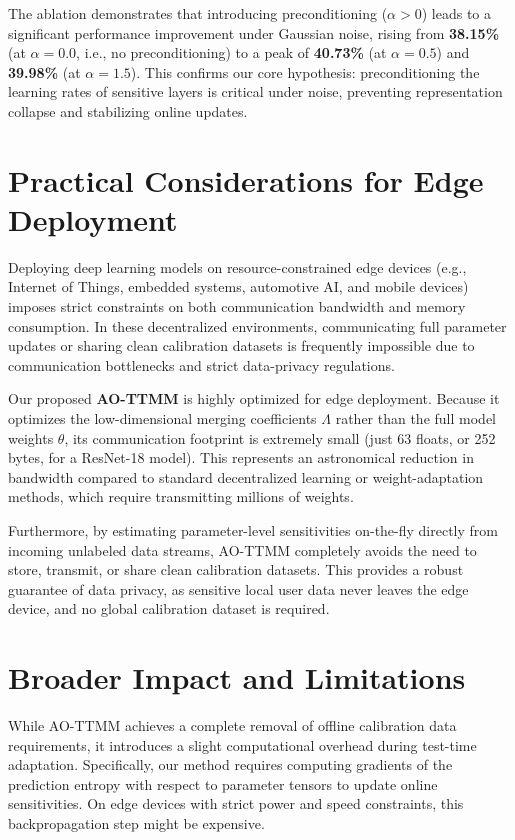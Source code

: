 \documentclass{article}
\theoremstyle{plain}
\theoremstyle{definition}
\begin{document}
The ablation demonstrates that introducing preconditioning ($\alpha > 0$) leads to a significant performance improvement under Gaussian noise, rising from \textbf{38.15\%} (at $\alpha = 0.0$, i.e., no preconditioning) to a peak of \textbf{40.73\%} (at $\alpha = 0.5$) and \textbf{39.98\%} (at $\alpha = 1.5$). This confirms our core hypothesis: preconditioning the learning rates of sensitive layers is critical under noise, preventing representation collapse and stabilizing online updates.

\section{Practical Considerations for Edge Deployment}
\label{submission-practical-considerations}

Deploying deep learning models on resource-constrained edge devices (e.g., Internet of Things, embedded systems, automotive AI, and mobile devices) imposes strict constraints on both communication bandwidth and memory consumption. In these decentralized environments, communicating full parameter updates or sharing clean calibration datasets is frequently impossible due to communication bottlenecks and strict data-privacy regulations.

Our proposed \textbf{AO-TTMM} is highly optimized for edge deployment. Because it optimizes the low-dimensional merging coefficients $\Lambda$ rather than the full model weights $\theta$, its communication footprint is extremely small (just 63 floats, or 252 bytes, for a ResNet-18 model). This represents an astronomical reduction in bandwidth compared to standard decentralized learning or weight-adaptation methods, which require transmitting millions of weights.

Furthermore, by estimating parameter-level sensitivities on-the-fly directly from incoming unlabeled data streams, AO-TTMM completely avoids the need to store, transmit, or share clean calibration datasets. This provides a robust guarantee of data privacy, as sensitive local user data never leaves the edge device, and no global calibration dataset is required.

\section{Broader Impact and Limitations}
\label{submission-limitations}

While AO-TTMM achieves a complete removal of offline calibration data requirements, it introduces a slight computational overhead during test-time adaptation. Specifically, our method requires computing gradients of the prediction entropy with respect to parameter tensors to update online sensitivities. On edge devices with strict power and speed constraints, this backpropagation step might be expensive. 
\end{document}
